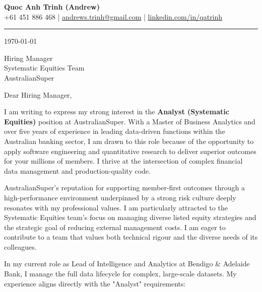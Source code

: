 \documentclass[11pt, a4paper]{article}
\begin{document}
\begin{center}
    {\LARGE \textbf{Quoc Anh Trinh (Andrew)}}\\[4pt]
    {\small
        +61 451 886 468 \quad|\quad
        \href{mailto:andrews.trinh@gmail.com}{andrews.trinh@gmail.com} \quad|\quad
        \href{https://www.linkedin.com/in/qatrinh}{linkedin.com/in/qatrinh}
    }
\end{center}

\vspace{4pt}
\hrule
\vspace{14pt}

\today

\vspace{8pt}

Hiring Manager\\
Systematic Equities Team\\
AustralianSuper

\vspace{10pt}

Dear Hiring Manager,

I am writing to express my strong interest in the \textbf{Analyst (Systematic Equities)} position at AustralianSuper. With a Master of Business Analytics and over five years of experience in leading data-driven functions within the Australian banking sector, I am drawn to this role because of the opportunity to apply software engineering and quantitative research to deliver superior outcomes for your millions of members. I thrive at the intersection of complex financial data management and production-quality code.

AustralianSuper’s reputation for supporting member-first outcomes through a high-performance environment underpinned by a strong risk culture deeply resonates with my professional values. I am particularly attracted to the Systematic Equities team's focus on managing diverse listed equity strategies and the strategic goal of reducing external management costs. I am eager to contribute to a team that values both technical rigour and the diverse needs of its colleagues.

In my current role as Lead of Intelligence and Analytics at Bendigo \& Adelaide Bank, I manage the full data lifecycle for complex, large-scale datasets. My experience aligns directly with the "Analyst" requirements:
\end{document}
